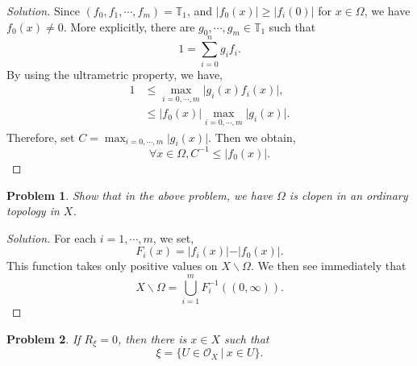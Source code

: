 \documentclass[8pt]{article}
\numberwithin{equation}{section}
\newenvironment{solution}{\begin{proof}[Solution]}{\end{proof}}
\newtheorem{problem}{Problem}[section]
\newcommand{\Ouv}{\mathscr{O}}
\newcommand{\T}[0]{\mathbb{T}}
\newcommand{\sep}[0]{\:|\:}
\newcommand{\ab}[1]{\vert #1 \vert}
\begin{document}
\begin{solution}
  Since $(f_0,f_1,\cdots,f_m) = \T_1$, and $\ab{f_0(x)}\geq \ab{f_i(0)}$ for $x\in\Omega$, we have $f_0(x)\not=0$. More explicitly, there are $g_0,\cdots,g_m\in\T_1$ such that 
  \begin{equation*}
    1 = \sum_{i=0}^n g_if_i.
  \end{equation*}
  By using the ultrametric property, we have,
  \begin{align*}
    1&\leq \max_{i=0,\cdots,m}\ab{g_i(x)f_i(x)},\\
    &\leq \ab{f_0(x)}\max_{i=0,\cdots,m}\ab{g_i(x)}.
  \end{align*}
  Therefore, set $C = \max_{i=0,\cdots,m}\ab{g_i(x)}$. Then we obtain,
  \begin{equation*}
    \forall x\in \Omega,C^{-1}\leq \ab{f_0(x)}.
  \end{equation*}
\end{solution}
\begin{problem}
  Show that in the above problem, we have $\Omega$ is clopen in an ordinary topology in $X$.
\end{problem}
\begin{solution}
  For each $i=1,\cdots,m$, we set,
  \begin{equation*}
    F_i(x) = \ab{f_i(x)}-\ab{f_0(x)}.
  \end{equation*}
  This function takes only positive values on $X\backslash \Omega$. We then see immediately that 
  \begin{equation*}
    X\backslash \Omega = \bigcup_{i=1}^m F_i^{-1}((0,\infty)).
  \end{equation*}
\end{solution}
\begin{problem}
  If $R_\xi = 0$, then there is $x\in X$ such that 
  \begin{equation*}
    \xi = \{U\in\Ouv_X\sep x\in U\}.
  \end{equation*}
\end{problem}
\end{document}
